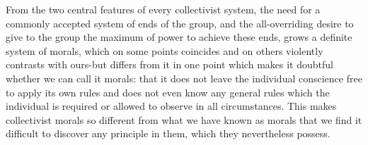 \documentclass[11pt,openany]{book}
\begin{document}
\begin{center}\textasteriskcentered\hspace{0.9em}\textasteriskcentered\hspace{0.9em}\textasteriskcentered\end{center}

\begin{center}\textasteriskcentered\hspace{0.9em}\textasteriskcentered\hspace{0.9em}\textasteriskcentered\end{center}

\begin{center}\textasteriskcentered\hspace{0.9em}\textasteriskcentered\hspace{0.9em}\textasteriskcentered\end{center}

\begin{center}\textasteriskcentered\hspace{0.9em}\textasteriskcentered\hspace{0.9em}\textasteriskcentered\end{center}

\begin{center}\textasteriskcentered\hspace{0.9em}\textasteriskcentered\hspace{0.9em}\textasteriskcentered\end{center}

From the two central features of every collectivist system, the need for a commonly accepted system of ends of the group, and the all-overriding desire to give to the group the maximum of power to achieve these ends, grows a definite system of morals, which on some points coincides and on others violently contrasts with ours-but differs from it in one point which makes it doubtful whether we can call it morals: that it does not leave the individual conscience free to apply its own rules and does not even know any general rules which the individual is required or allowed to observe in all circumstances. This makes collectivist morals so different from what we have known as morals that we find it difficult to discover any principle in them, which they nevertheless possess.
\end{document}
